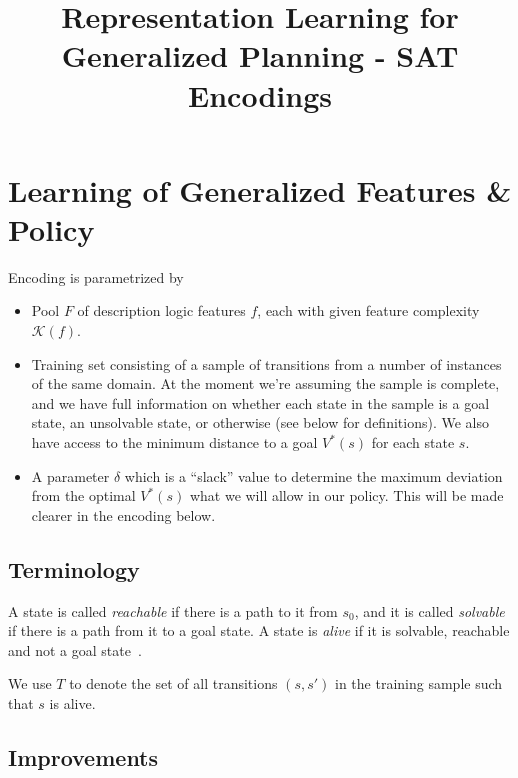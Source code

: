 \documentclass[a4paper]{article}
\title{Representation Learning for Generalized Planning - SAT Encodings}
\begin{document}
\maketitle

\section{Learning of Generalized Features \& Policy}

Encoding is parametrized by
\begin{itemize}
 \item Pool $F$ of description logic features $f$, each with given feature complexity $\mathcal{K}(f)$.
 \item Training set consisting of a sample of transitions from a number of instances of the same domain.
       At the moment we're assuming the sample is complete, and we have full information on whether each state
       in the sample is a goal state, an unsolvable state, or otherwise (see below for definitions). We also have access
       to the minimum distance to a goal $V^*(s)$ for each state $s$.
 \item A parameter $\delta$ which is a ``slack'' value to determine the maximum deviation from the optimal $V^*(s)$
 what we will allow in our policy. This will be made clearer in the encoding below.
\end{itemize}


\subsection{Terminology}
A state is called \emph{reachable} if there is a path to it from $s_0$, and
it is called \emph{solvable} if there is a path from it to a goal
state.
A state is \emph{alive} if it is solvable, reachable and not a
goal state~\cite{frances-et-al-ijcai2019}.

We use $T$ to denote the set of all transitions $(s, s')$ in the training sample such that $s$ is alive.

\subsection{Improvements}
\end{document}
